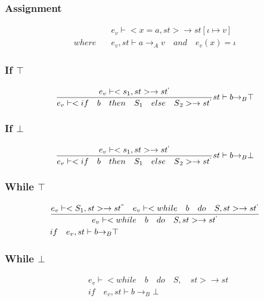\subsubsection{Assignment}
\begin{align*}
	&{ e }_{ v }\vdash <x=a,st>\rightarrow st[\iota \mapsto v]\\
	where\quad &{ e }_{ v },st\vdash a{ \rightarrow  }_{ A }v\quad and\quad  { e }_{ v }(x)=\iota 
\end{align*}

\subsubsection{If $\top$}
\begin{equation}
	\frac { { e }_{ v }\vdash <{ s }_{ 1 },st>\rightarrow { st }^{ ` } }{ { e }_{ v }\vdash <if\quad b\quad then\quad { S }_{ 1 }\quad else{ \quad S }_{ 2 }>\rightarrow { st }^{ ` } } st\vdash b{ \rightarrow  }_{ B }\top 
\end{equation}

\subsubsection{If $\bot$}
\begin{equation}
	\frac { { e }_{ v }\vdash <{ s }_{ 1 },st>\rightarrow { st }^{ ` } }{ { e }_{ v }\vdash <if\quad b\quad then\quad { S }_{ 1 }\quad else{ \quad S }_{ 2 }>\rightarrow { st }^{ ` } } st\vdash b{ \rightarrow  }_{ B }\bot 
\end{equation}


\subsubsection{While $\top$}
\begin{align*}
	&\frac { { e }_{ v }\vdash <{ S }_{ 1 },st>\rightarrow { st }^{ `` }\quad { e }_{ v }\vdash <while\quad b\quad do\quad S,st>\rightarrow { st }^{ ` } }{ { e }_{ v }\vdash <while\quad b\quad do\quad S,st>\rightarrow { st }^{ ` } }\\
	&if\quad { e }_{ v },st\vdash b{ \rightarrow  }_{ B }\top 
\end{align*}


\subsubsection{While $\bot$}
\begin{align*}
	&{ e }_{ v }\vdash <while\quad b\quad do\quad S,\quad st>\rightarrow st\\
	&if\quad { e }_{ v },st\vdash b{ \rightarrow  }_{ B }\bot
\end{align*}

